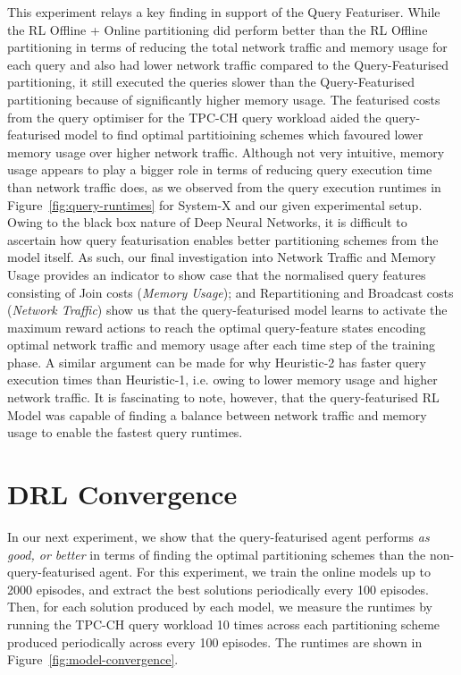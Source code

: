 This experiment relays a key finding in support of the Query Featuriser. While the RL Offline + Online partitioning did perform better than the RL Offline partitioning in terms of reducing the total network traffic and memory usage for each query and also had lower network traffic compared to the Query-Featurised partitioning, it still executed the queries slower than the Query-Featurised partitioning because of significantly higher memory usage. The featurised costs from the query optimiser for the TPC-CH query workload aided the query-featurised model to find optimal partitioining schemes which favoured lower memory usage over higher network traffic. Although not very intuitive, memory usage appears to play a bigger role in terms of reducing query execution time than network traffic does, as we observed from the query execution runtimes in Figure~\ref{fig:query-runtimes} for System-X and our given experimental setup. Owing to the black box nature of Deep Neural Networks, it is difficult to ascertain how query featurisation enables better partitioning schemes from the model itself. As such, our final investigation into Network Traffic and Memory Usage provides an indicator to show case that the normalised query features consisting of Join costs (\textit{Memory Usage}); and Repartitioning and Broadcast costs (\textit{Network Traffic}) show us that the query-featurised model learns to activate the maximum reward actions to reach the optimal query-feature states encoding optimal network traffic and memory usage after each time step of the training phase. A similar argument can be made for why Heuristic-2 has faster query execution times than Heuristic-1, i.e. owing to lower memory usage and higher network traffic. It is fascinating to note, however, that the query-featurised RL Model was capable of finding a balance between network traffic and memory usage to enable the fastest query runtimes.

\section{DRL Convergence}
\label{sec:modelconv}
In our next experiment, we show that the query-featurised agent performs \textit{as good, or better} in terms of finding the optimal 
partitioning schemes than the non-query-featurised agent. For this experiment, we train the online models up to 2000 episodes, and extract the best solutions periodically every 100 episodes. Then, for each solution produced by each model, we measure the runtimes by running the TPC-CH query workload 10 times across each partitioning scheme produced periodically across every 100 episodes. The runtimes are shown in Figure~\ref{fig:model-convergence}.

